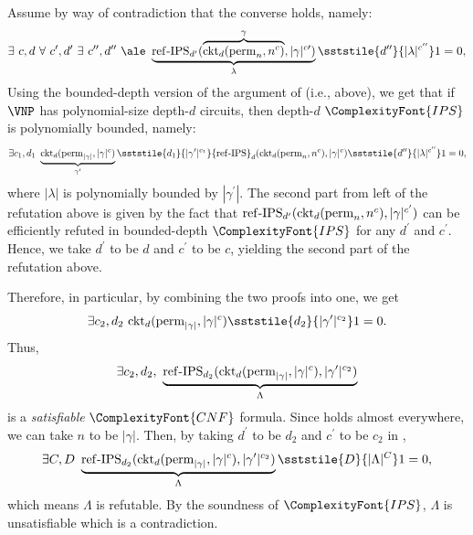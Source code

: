 \documentclass[11pt,letter]{article}
\theoremstyle{remark} %
\newcommand{\perm}{{\rm perm}}
\newcommand{\IPS}{%
    {
        \ComplexityFont{IPS} 
    }
}
\newcommand{\CNF}{ %
    {
        \ComplexityFont{CNF}
    }
}
\begin{document}
{Assume by way of contradiction that the converse holds, namely:\vspace{-8pt} 
\begin{equation}\label{eq:328:30}
\exists\ c, d \ \forall \ c^\prime, d^\prime\ \exists \ c^{\prime\prime} ,d^{\prime\prime}\ \ale~
\underbrace{{\rm ref\text{-}IPS}_{d^\prime}(\overbrace{{\rm ckt}_d(\perm_n,n^c)}^{\gamma}, |\gamma|^{c\prime}) }_{\lambda} \sststile{d^{\prime\prime}}{|\lambda|^{c^{\prime\prime}}} 1=0,
\end{equation}
Using the bounded-depth version of the argument of \cite{GP18} (i.e.,   above), we get that if $\VNP$ has polynomial-size depth-$d$ circuits, then depth-$d$ $\IPS$ is polynomially bounded, namely:
\begin{equation*}
\exists c_1, d_1 \  \underbrace{{\rm ckt}_d(\perm_{|\gamma|},|\gamma|^c)}_{\gamma^\prime} \sststile{d_1}{|\gamma^\prime|^{c_1}} {\rm ref\text{-}IPS}_{d}({\rm ckt}_d(\perm_n,n^c), |\gamma|^{c}) \sststile{d^{\prime\prime}}{|\lambda|^{c^{\prime\prime}}} 1=0,
\end{equation*}
where $|\lambda|$ is polynomially bounded by $|\gamma^\prime|$. The second part from left of the refutation above is given by the fact that ${\rm ref\text{-}IPS}_{d^\prime}({\rm ckt}_d(\perm_n,n^c), |\gamma|^{c^\prime})$ can be efficiently refuted in bounded-depth $\IPS$ for any $d^\prime$ and $c^\prime$. Hence, we take $d^\prime$ to be $d$ and $c^\prime$ to be $c$, yielding the second part of the refutation above.

Therefore, in particular, by combining the two proofs into one, we get \vspace{-8pt} 
\begin{equation*}
\exists c_2, d_2 \ {\rm ckt}_d(\perm_{|\gamma|},|\gamma|^c) \sststile{d_2}{|\gamma^\prime|^{c_2}}1=0.
\end{equation*}
Thus,\vspace{-8pt}
\begin{equation*}
\exists c_2,d_2,\ \underbrace{{\rm ref\text{-}IPS}_{d_2}({\rm ckt}_d(\perm_{|\gamma|},|\gamma|^c), |\gamma^\prime|^{c_2})}_{\Lambda} \end{equation*}
is a \emph{satisfiable} $\CNF$ formula.
Since  holds almost everywhere, we can take $n$ to be $|\gamma|$. Then, by taking $d^\prime$ to be $d_2$ and $c^\prime$ to be $c_2$ in ,
\begin{equation*}\vspace{-8pt}
    \exists C, D \ \underbrace{{\rm ref\text{-}IPS}_{d_2}({\rm ckt}_d(\perm_{|\gamma|},|\gamma|^c), |\gamma^\prime|^{c_2})}_{\Lambda} \sststile{D}{|\Lambda|^C} 1=0,
\end{equation*}
which means $\Lambda$ is refutable. By the soundness of $\IPS$, $\Lambda$ is unsatisfiable which is a contradiction.
\bigskip




}
\end{document}
